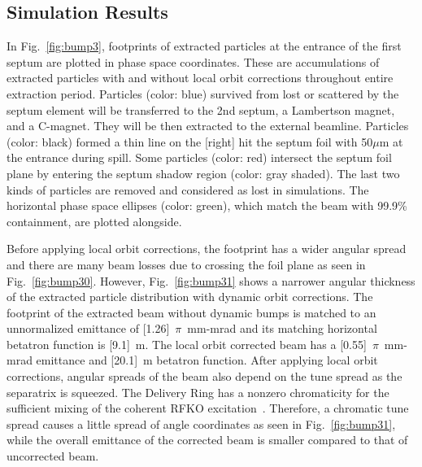 \documentclass[aps,prstab,onecolumn,preprint,endfloats,11pt]{revtex4-1}
\begin{document}
\subsection{\label{sec:bump2}Simulation Results}

In Fig.~\ref{fig:bump3}, footprints of extracted particles at the entrance of the first septum are plotted in phase space coordinates. These are accumulations of extracted particles with and without local orbit corrections throughout entire extraction period. Particles (color: blue) survived from lost or scattered by the septum element will be transferred to the 2nd septum, a Lambertson magnet, and a C-magnet. They will be then extracted to the external beamline. Particles (color: black) formed a thin line on the [right] hit the septum foil with 50$\mu$m at the entrance during spill. Some particles (color: red) intersect the septum foil plane by entering the septum shadow region (color: gray shaded). The last two kinds of particles are removed and considered as lost in simulations. The horizontal phase space ellipses (color: green), which match the beam with 99.9\% containment, are plotted alongside.

Before applying local orbit corrections, the footprint has a wider angular spread and there are many beam losses due to crossing the foil plane as seen in Fig.~\ref{fig:bump30}. However, Fig.~\ref{fig:bump31} shows a narrower angular thickness of the extracted particle distribution with dynamic orbit corrections. The footprint of the extracted beam without dynamic bumps is matched to an unnormalized emittance of [1.26]~$\pi$~mm-mrad and its matching horizontal betatron function is [9.1]~m. The local orbit corrected beam has a [0.55]~$\pi$~mm-mrad emittance and [20.1]~m betatron function. After applying local orbit corrections, angular spreads of the beam also depend on the tune spread as the separatrix is squeezed.
The Delivery Ring has a nonzero chromaticity for the sufficient mixing of the coherent RFKO excitation~\cite{ipac11}. Therefore, a chromatic tune spread causes a little spread of angle coordinates as seen in Fig.~\ref{fig:bump31}, while the overall emittance of the corrected beam is smaller compared to that of uncorrected beam.
\end{document}
